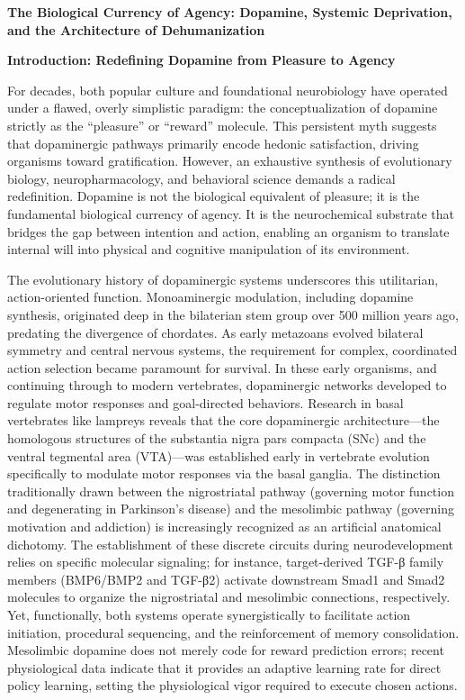 ﻿\textbf{The Biological Currency of Agency: Dopamine, Systemic Deprivation, and the Architecture of Dehumanization}

\textbf{Introduction: Redefining Dopamine from Pleasure to Agency}

For decades, both popular culture and foundational neurobiology have operated under a flawed, overly simplistic paradigm: the conceptualization of dopamine strictly as the ``pleasure'' or ``reward'' molecule. This persistent myth suggests that dopaminergic pathways primarily encode hedonic satisfaction, driving organisms toward gratification. However, an exhaustive synthesis of evolutionary biology, neuropharmacology, and behavioral science demands a radical redefinition. Dopamine is not the biological equivalent of pleasure; it is the fundamental biological currency of agency. It is the neurochemical substrate that bridges the gap between intention and action, enabling an organism to translate internal will into physical and cognitive manipulation of its environment.

The evolutionary history of dopaminergic systems underscores this utilitarian, action-oriented function. Monoaminergic modulation, including dopamine synthesis, originated deep in the bilaterian stem group over 500 million years ago, predating the divergence of chordates. As early metazoans evolved bilateral symmetry and central nervous systems, the requirement for complex, coordinated action selection became paramount for survival. In these early organisms, and continuing through to modern vertebrates, dopaminergic networks developed to regulate motor responses and goal-directed behaviors. Research in basal vertebrates like lampreys reveals that the core dopaminergic architecture---the homologous structures of the substantia nigra pars compacta (SNc) and the ventral tegmental area (VTA)---was established early in vertebrate evolution specifically to modulate motor responses via the basal ganglia. The distinction traditionally drawn between the nigrostriatal pathway (governing motor function and degenerating in Parkinson's disease) and the mesolimbic pathway (governing motivation and addiction) is increasingly recognized as an artificial anatomical dichotomy. The establishment of these discrete circuits during neurodevelopment relies on specific molecular signaling; for instance, target-derived TGF-β family members (BMP6/BMP2 and TGF-β2) activate downstream Smad1 and Smad2 molecules to organize the nigrostriatal and mesolimbic connections, respectively. Yet, functionally, both systems operate synergistically to facilitate action initiation, procedural sequencing, and the reinforcement of memory consolidation. Mesolimbic dopamine does not merely code for reward prediction errors; recent physiological data indicate that it provides an adaptive learning rate for direct policy learning, setting the physiological vigor required to execute chosen actions.

